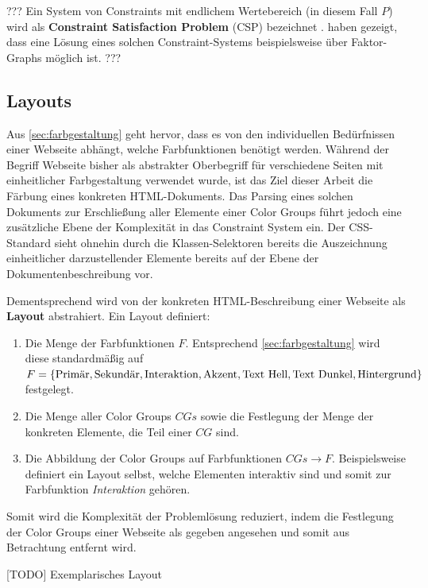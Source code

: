 \documentclass[11pt, bibliography=totoc]{scrartcl}
\begin{document}
???
Ein System von Constraints mit endlichem Wertebereich (in diesem Fall $P$) wird als \textbf{Constraint Satisfaction Problem} (CSP) bezeichnet \citep{constraint-programmierung}. \citet{magazines} haben gezeigt, dass eine Lösung eines solchen Constraint-Systems beispielsweise über Faktor-Graphs möglich ist.
???

\subsection{Layouts}

Aus \autoref{sec:farbgestaltung} geht hervor, dass es von den individuellen Bedürfnissen einer Webseite abhängt, welche Farbfunktionen benötigt werden. Während der Begriff Webseite bisher als abstrakter Oberbegriff für verschiedene Seiten mit einheitlicher Farbgestaltung verwendet wurde, ist das Ziel dieser Arbeit die Färbung eines konkreten HTML-Dokuments. Das Parsing eines solchen Dokuments zur Erschließung aller Elemente einer Color Groups führt jedoch eine zusätzliche Ebene der Komplexität in das Constraint System ein. Der CSS-Standard sieht ohnehin durch die Klassen-Selektoren \citep{css3-selectors} bereits die Auszeichnung einheitlicher darzustellender Elemente bereits auf der Ebene der Dokumentenbeschreibung vor.

Dementsprechend wird von der konkreten HTML-Beschreibung einer Webseite als  \textbf{Layout} abstrahiert. Ein Layout definiert:
\begin{enumerate}
	\item Die Menge der Farbfunktionen $F$. Entsprechend \autoref{sec:farbgestaltung} wird diese standardmäßig auf $F = \{\text{Primär}, \text{Sekundär}, \text{Interaktion},\\ \text{Akzent}, \text{Text Hell}, \text{Text Dunkel}, \text{Hintergrund}\}$ festgelegt.
	\item Die Menge aller Color Groups $CGs$ sowie die Festlegung der Menge der konkreten Elemente, die Teil einer $CG$ sind.
 	\item Die Abbildung der Color Groups auf Farbfunktionen $CGs \to F$. Beispielsweise definiert ein Layout selbst, welche Elementen interaktiv sind und somit zur Farbfunktion \emph{Interaktion} gehören.
\end{enumerate}

Somit wird die Komplexität der Problemlösung reduziert, indem die Festlegung der Color Groups einer Webseite als gegeben angesehen und somit aus Betrachtung entfernt wird.

[TODO] Exemplarisches Layout
\end{document}
